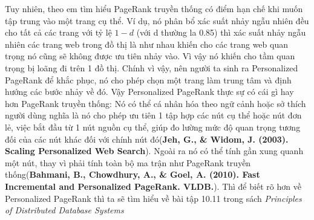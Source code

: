 \documentclass[conference]{IEEEtran}
\begin{document}
Tuy nhiên, theo em tìm hiểu PageRank truyền thống có điểm hạn chế khi muốn tập trung vào một trang cụ thể. Ví dụ, nó phân bổ xác suất nhảy ngẫu nhiên đều cho tất cả các trang với tỷ lệ \(1 - d\) (với d thường la 0.85) thì xác suất nhảy ngẫu nhiên các trang web trong đồ thị là như nhau khiến cho các trang web quan trọng nó cũng sẽ không được ưu tiên nhảy vào. Vì vậy nó khiến cho tầm quan trọng bị loãng đi trên 1 đồ thị. Chính vì vậy, nên người ta sinh ra Personalized PageRank để khắc phục, nó cho phép chọn một trang làm trung tâm và định hướng các bước nhảy về đó. Vậy Personalized PageRank thực sự có cái gì hay hơn PageRank truyền thống: Nó có thể cá nhân hóa theo ngữ cảnh hoặc sở thích người dùng nghĩa là nó cho phép ưu tiên 1 tập hợp các nút cụ thể hoặc nút đơn lẻ, việc bắt đầu từ 1 nút nguồn cụ thể, giúp đo lường mức độ quan trọng tương đối của các nút khác đối với chính nút đó(\textbf{Jeh, G., & Widom, J. (2003). Scaling Personalized Web Search}). Ngoài ra nó có thể tính gần xung quanh một nút, thay vì phải tính toàn bộ ma trận như PageRank truyền thống(\textbf{Bahmani, B., Chowdhury, A., & Goel, A. (2010). Fast Incremental and Personalized PageRank. VLDB.}). Thì để biết rõ hơn về Personalized PageRank thì ta sẽ tìm hiểu về bài tập 10.11 trong sách \emph{Principles of Distributed Database Systems}
\end{document}
